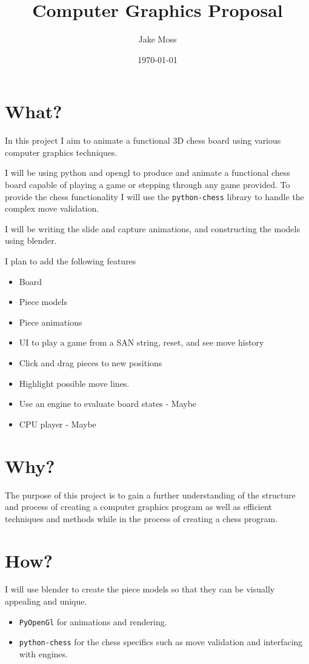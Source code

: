 \documentclass[11pt]{article}
\author{Jake Moss}
\date{\today}
\title{Computer Graphics Proposal}
\begin{document}
\maketitle

\section{What?}
\label{sec:orgd154424}
In this project I aim to animate a functional 3D chess board using various computer graphics techniques.

I will be using python and opengl to produce and animate a functional chess board capable of playing a game or stepping through any game provided. To provide the chess functionality I will use the \texttt{python-chess} library to handle the complex move validation.

I will be writing the slide and capture animations, and constructing the models using blender.

I plan to add the following features
\begin{itemize}
\item Board
\item Piece models
\item Piece animations
\item UI to play a game from a SAN string, reset, and see move history
\item Click and drag pieces to new positions
\item Highlight possible move lines.
\item Use an engine to evaluate board states - Maybe
\item CPU player - Maybe
\end{itemize}
\section{Why?}
\label{sec:org7c371ae}
The purpose of this project is to gain a further understanding of the structure and process of creating a computer graphics program as well as efficient techniques and methods while in the process of creating a chess program.
\section{How?}
\label{sec:org1776a0e}
I will use blender to create the piece models so that they can be visually appealing and unique.
\begin{itemize}
\item \texttt{PyOpenGl} for animations and rendering.
\item \texttt{python-chess} for the chess specifics such as move validation and interfacing with engines.
\end{itemize}
\end{document}
